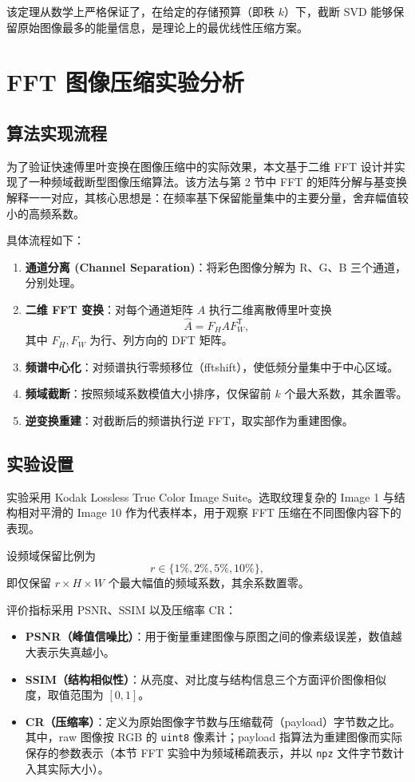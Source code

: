 \documentclass[12pt,a4paper]{article}
\begin{document}
该定理从数学上严格保证了，在给定的存储预算（即秩 $k$）下，截断 SVD 能够保留原始图像最多的能量信息，是理论上的最优线性压缩方案。

\section{FFT 图像压缩实验分析}

\subsection{算法实现流程}
为了验证快速傅里叶变换在图像压缩中的实际效果，本文基于二维 FFT 设计并实现了一种频域截断型图像压缩算法。该方法与第 2 节中 FFT 的矩阵分解与基变换解释一一对应，其核心思想是：在频率基下保留能量集中的主要分量，舍弃幅值较小的高频系数。

具体流程如下：
\begin{enumerate}
    \item \textbf{通道分离 (Channel Separation)}：将彩色图像分解为 R、G、B 三个通道，分别处理。
    \item \textbf{二维 FFT 变换}：对每个通道矩阵 $A$ 执行二维离散傅里叶变换
    \[
    \hat{A} = F_H A F_W^\mathsf{T},
    \]
    其中 $F_H, F_W$ 为行、列方向的 DFT 矩阵。
    \item \textbf{频谱中心化}：对频谱执行零频移位（fftshift），使低频分量集中于中心区域。
    \item \textbf{频域截断}：按照频域系数模值大小排序，仅保留前 $k$ 个最大系数，其余置零。
    \item \textbf{逆变换重建}：对截断后的频谱执行逆 FFT，取实部作为重建图像。
\end{enumerate}

\subsection{实验设置}

实验采用 Kodak Lossless True Color Image Suite。选取纹理复杂的 Image 1 与结构相对平滑的 Image 10 作为代表样本，用于观察 FFT 压缩在不同图像内容下的表现。

设频域保留比例为
\[
r \in \{1\%, 2\%, 5\%, 10\%\},
\]
即仅保留 $r \times H \times W$ 个最大幅值的频域系数，其余系数置零。

评价指标采用 PSNR、SSIM 以及压缩率 CR：
\begin{itemize}
    \item \textbf{PSNR（峰值信噪比）}：用于衡量重建图像与原图之间的像素级误差，数值越大表示失真越小。
    \item \textbf{SSIM（结构相似性）}：从亮度、对比度与结构信息三个方面评价图像相似度，取值范围为 $[0,1]$。
    \item \textbf{CR（压缩率）}：定义为原始图像字节数与压缩载荷（payload）字节数之比。其中，raw 图像按 RGB 的 \texttt{uint8} 像素计；payload 指算法为重建图像而实际保存的参数表示（本节 FFT 实验中为频域稀疏表示，并以 \texttt{npz} 文件字节数计入其实际大小）。
\end{itemize}
\end{document}
